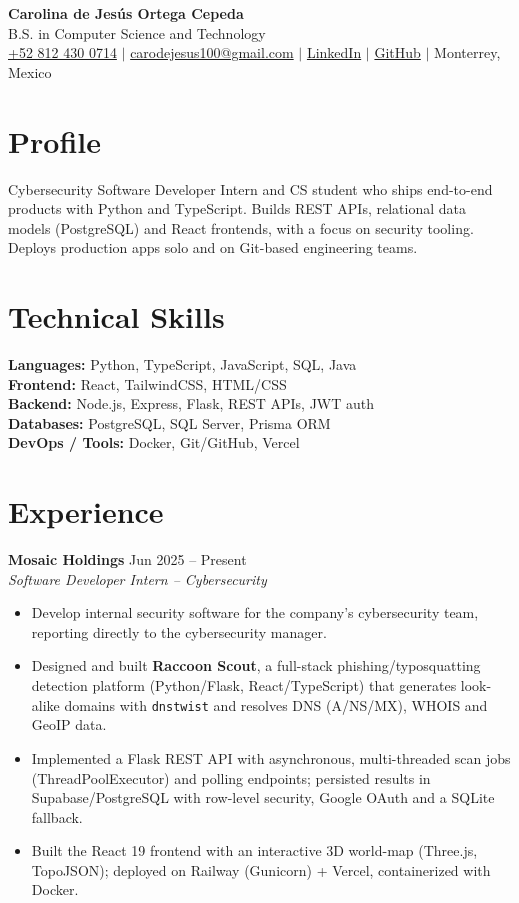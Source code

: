 \documentclass[10pt,letterpaper]{article}
\newcommand{\resumeSubheading}[3]{%
  \vspace{2pt}\textbf{#1} \hfill #2 \\
  \textit{#3} \\
}
\begin{document}
\begin{center}
    {\LARGE \textbf{Carolina de Jes\'us Ortega Cepeda}} \\
    \vspace{2pt}
    B.S. in Computer Science and Technology \\
    \vspace{3pt}
    \href{tel:8124300714}{+52 812 430 0714} $|$
    \href{mailto:carodejesus100@gmail.com}{carodejesus100@gmail.com} $|$
    \href{https://www.linkedin.com/in/caro-ortega-cepeda-83ba3424b}{LinkedIn} $|$
    \href{https://github.com/AthensCort}{GitHub} $|$
    Monterrey, Mexico
\end{center}

\section{Profile}
Cybersecurity Software Developer Intern and CS student who ships end-to-end products with Python and TypeScript. Builds REST APIs, relational data models (PostgreSQL) and React frontends, with a focus on security tooling. Deploys production apps solo and on Git-based engineering teams.

\section{Technical Skills}
\textbf{Languages:} Python, TypeScript, JavaScript, SQL, Java \\
\textbf{Frontend:} React, TailwindCSS, HTML/CSS \\
\textbf{Backend:} Node.js, Express, Flask, REST APIs, JWT auth \\
\textbf{Databases:} PostgreSQL, SQL Server, Prisma ORM \\
\textbf{DevOps / Tools:} Docker, Git/GitHub, Vercel

\section{Experience}
\resumeSubheading{Mosaic Holdings}{Jun 2025 -- Present}{Software Developer Intern -- Cybersecurity}
\begin{itemize}
    \item Develop internal security software for the company's cybersecurity team, reporting directly to the cybersecurity manager.
    \item Designed and built \textbf{Raccoon Scout}, a full-stack phishing/typosquatting detection platform (Python/Flask, React/TypeScript) that generates look-alike domains with \texttt{dnstwist} and resolves DNS (A/NS/MX), WHOIS and GeoIP data.
    \item Implemented a Flask REST API with asynchronous, multi-threaded scan jobs (ThreadPoolExecutor) and polling endpoints; persisted results in Supabase/PostgreSQL with row-level security, Google OAuth and a SQLite fallback.
    \item Built the React 19 frontend with an interactive 3D world-map (Three.js, TopoJSON); deployed on Railway (Gunicorn) + Vercel, containerized with Docker.
\end{itemize}
\end{document}

